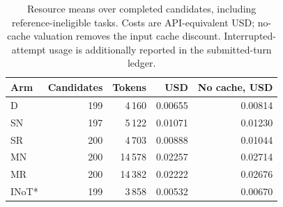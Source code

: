 \begin{table}[htbp]\centering\small
\caption{Resource means over completed candidates, including reference-ineligible tasks. Costs are API-equivalent USD; no-cache valuation removes the input cache discount. Interrupted-attempt usage is additionally reported in the submitted-turn ledger.}\label{tab:heldout-resources}
\begin{tabular}{lrrrr}\toprule
Arm & Candidates & Tokens & USD & No cache, USD\\
\midrule
D & 199 & 4\,160 & 0.00655 & 0.00814\\
SN & 197 & 5\,122 & 0.01071 & 0.01230\\
SR & 200 & 4\,703 & 0.00888 & 0.01044\\
MN & 200 & 14\,578 & 0.02257 & 0.02714\\
MR & 200 & 14\,382 & 0.02222 & 0.02676\\
INoT* & 199 & 3\,858 & 0.00532 & 0.00670\\
\bottomrule\end{tabular}\end{table}
